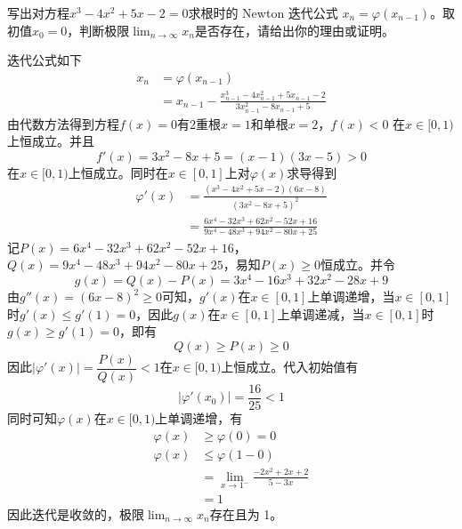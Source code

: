 \documentclass[11pt]{article}
\begin{document}
\begin{question}

    \questiontext
    {
        写出对方程$x^3 - 4x^2 + 5x - 2 =0$求根时的 Newton 迭代公式 $x_n = \varphi(x_{n - 1})$。取初值$x_0 = 0$，判断极限$\displaystyle \lim_{n \rightarrow \infty}{x_n}$是否存在，请给出你的理由或证明。
    }

    \answer
    {
    迭代公式如下
    \begin{align*}
        x_n & = \varphi(x_{n - 1})                                                                            \\
            & = x_{n - 1} - \frac{x_{n - 1}^3 - 4x_{n - 1}^2 + 5x_{n - 1} - 2}{3x_{n - 1}^2 - 8x_{n - 1} + 5}
    \end{align*}
    由代数方法得到方程$f(x) = 0$有2重根$x = 1$和单根$x = 2$，$f(x) < 0$ 在$x \in [0, 1)$上恒成立。并且 $$f'(x) = 3 x^2 - 8 x + 5  = (x-1) (3 x-5) > 0$$ 在$x \in [0, 1)$上恒成立。同时在$x \in [0, 1]$上对$\varphi(x)$求导得到
    \begin{align*}
        \varphi'(x) & = \frac{(x^3 - 4x^2 + 5x - 2)(6x - 8)}{(3x^2 - 8x + 5)^2}         \\
                    & = \frac{6 x^4-32 x^3+62 x^2-52 x+16}{9 x^4-48 x^3+94 x^2-80 x+25}
    \end{align*}
    记$P(x) = 6 x^4-32 x^3+62 x^2-52 x+16$，$Q(x) = 9 x^4-48 x^3+94 x^2-80 x+25$，易知$P(x) \geqslant 0$恒成立。并令
    \begin{equation*}
        g(x) = Q(x) - P(x) = 3 x^4-16 x^3+32 x^2-28 x+9
    \end{equation*}
    由$g''(x) = (6x - 8)^2 \geqslant 0$可知，$g'(x)$在$x \in [0, 1]$上单调递增，当$x \in [0, 1]$时$g'(x) \leqslant g'(1) = 0$，因此$g(x)$在$x \in [0, 1]$上单调递减，当$x \in [0, 1]$时$g(x) \geqslant g'(1) = 0$，即有
    \begin{equation*}
        Q(x) \geqslant P(x) \geqslant 0
    \end{equation*}
    因此$\left|\varphi'(x)\right| = \dfrac{P(x)}{Q(x)} < 1$在$x \in [0, 1)$上恒成立。代入初始值有
    \begin{equation*}
        \left|\varphi'(x_0)\right| = \frac{16}{25} < 1
    \end{equation*}
    同时可知$\varphi(x)$在$x \in [0, 1)$上单调递增，有
    \begin{align*}
        \varphi(x) & \geqslant \varphi(0) = 0                               \\
        \varphi(x) & \leqslant \varphi(1 - 0)                               \\
                   & = \lim_{x \rightarrow 1^-}{\frac{-2 x^2+2 x+2}{5-3 x}} \\
                   & = 1
    \end{align*}
    因此迭代是收敛的，极限$\displaystyle \lim_{n \rightarrow \infty}{x_n}$存在且为 1。
    }

\end{question}
\end{document}
